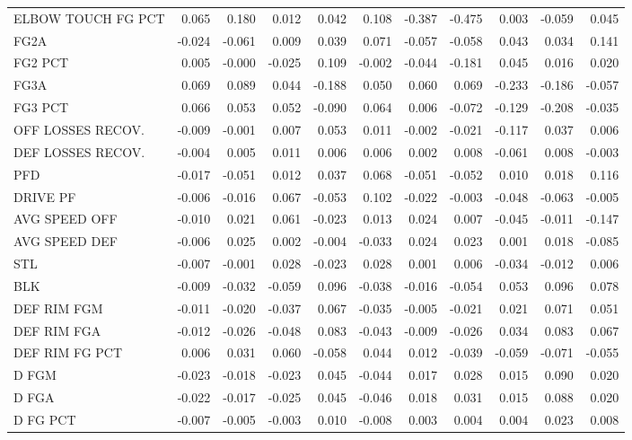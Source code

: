 \begin{tabular}{lrrrrrrrrrr}
ELBOW TOUCH FG PCT & 0.065 & 0.180 & 0.012 & 0.042 & 0.108 & -0.387 & -0.475 & 0.003 & -0.059 & 0.045 \\
FG2A & -0.024 & -0.061 & 0.009 & 0.039 & 0.071 & -0.057 & -0.058 & 0.043 & 0.034 & 0.141 \\
FG2 PCT & 0.005 & -0.000 & -0.025 & 0.109 & -0.002 & -0.044 & -0.181 & 0.045 & 0.016 & 0.020 \\
FG3A & 0.069 & 0.089 & 0.044 & -0.188 & 0.050 & 0.060 & 0.069 & -0.233 & -0.186 & -0.057 \\
FG3 PCT & 0.066 & 0.053 & 0.052 & -0.090 & 0.064 & 0.006 & -0.072 & -0.129 & -0.208 & -0.035 \\
OFF LOSSES RECOV. & -0.009 & -0.001 & 0.007 & 0.053 & 0.011 & -0.002 & -0.021 & -0.117 & 0.037 & 0.006 \\
DEF LOSSES RECOV. & -0.004 & 0.005 & 0.011 & 0.006 & 0.006 & 0.002 & 0.008 & -0.061 & 0.008 & -0.003 \\
PFD & -0.017 & -0.051 & 0.012 & 0.037 & 0.068 & -0.051 & -0.052 & 0.010 & 0.018 & 0.116 \\
DRIVE PF & -0.006 & -0.016 & 0.067 & -0.053 & 0.102 & -0.022 & -0.003 & -0.048 & -0.063 & -0.005 \\
AVG SPEED OFF & -0.010 & 0.021 & 0.061 & -0.023 & 0.013 & 0.024 & 0.007 & -0.045 & -0.011 & -0.147 \\
AVG SPEED DEF & -0.006 & 0.025 & 0.002 & -0.004 & -0.033 & 0.024 & 0.023 & 0.001 & 0.018 & -0.085 \\
STL & -0.007 & -0.001 & 0.028 & -0.023 & 0.028 & 0.001 & 0.006 & -0.034 & -0.012 & 0.006 \\
BLK & -0.009 & -0.032 & -0.059 & 0.096 & -0.038 & -0.016 & -0.054 & 0.053 & 0.096 & 0.078 \\
DEF RIM FGM & -0.011 & -0.020 & -0.037 & 0.067 & -0.035 & -0.005 & -0.021 & 0.021 & 0.071 & 0.051 \\
DEF RIM FGA & -0.012 & -0.026 & -0.048 & 0.083 & -0.043 & -0.009 & -0.026 & 0.034 & 0.083 & 0.067 \\
DEF RIM FG PCT & 0.006 & 0.031 & 0.060 & -0.058 & 0.044 & 0.012 & -0.039 & -0.059 & -0.071 & -0.055 \\
D FGM & -0.023 & -0.018 & -0.023 & 0.045 & -0.044 & 0.017 & 0.028 & 0.015 & 0.090 & 0.020 \\
D FGA & -0.022 & -0.017 & -0.025 & 0.045 & -0.046 & 0.018 & 0.031 & 0.015 & 0.088 & 0.020 \\
D FG PCT & -0.007 & -0.005 & -0.003 & 0.010 & -0.008 & 0.003 & 0.004 & 0.004 & 0.023 & 0.008 \\

\end{tabular}
